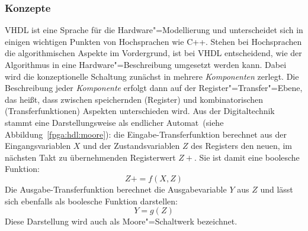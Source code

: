 \subsubsection{Konzepte}

VHDL ist eine Sprache für die Hardware"=Modellierung und unterscheidet sich in
einigen wichtigen Punkten von Hochsprachen wie C++. Stehen bei Hochsprachen
die algorithmischen Aspekte im Vordergrund, ist bei VHDL entscheidend, wie der
Algorithmus in eine Hardware"=Beschreibung umgesetzt werden kann. Dabei wird die
konzeptionelle Schaltung zunächst in mehrere \textit{Komponenten} zerlegt. Die
Beschreibung jeder \textit{Komponente} erfolgt dann auf der
Register"=Transfer"=Ebene, das heißt, dass zwischen speichernden (Register) und
kombinatorischen (Transferfunktionen) Aspekten unterschieden wird. Aus der
Digitaltechnik stammt eine Darstellungsweise als \glqq endlicher Automat\grqq\
(siehe Abbildung~\ref{fpga:hdl:moore}): die Eingabe-Transferfunktion berechnet
aus der Eingangsvariablen $X$ und der Zustandsvariablen $Z$ des Registers den
neuen, im nächsten Takt zu übernehmenden Registerwert $Z+$. Sie ist damit eine
boolesche Funktion:
%
\[
    Z+ = f(X, Z)
\]
%
Die Ausgabe-Transferfunktion berechnet die Ausgabevariable $Y$ aus $Z$ und lässt
sich ebenfalls als boolesche Funktion darstellen:
%
\[
    Y = g(Z)
\]
%
Diese Darstellung wird auch als Moore"=Schaltwerk bezeichnet.
\cite[vgl.][34--35]{kesel2013}
%
